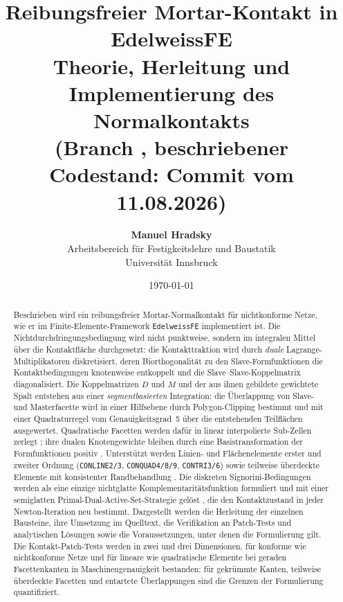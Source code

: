 \documentclass[a4paper,11pt]{article}
\title{\textbf{Reibungsfreier Mortar-Kontakt in EdelweissFE}\\
\large Theorie, Herleitung und Implementierung des Normalkontakts\\
\normalsize (Branch \code{0\_mortarcontact}, beschriebener Codestand: Commit \code{e2b57ac} vom 11.08.2026)}
\author{\textbf{Manuel Hradsky}\\
\small Arbeitsbereich f\"ur Festigkeitslehre und Baustatik\\
\small Universit\"at Innsbruck}
\date{\today}
\def\bm#1{#1}%
\newcommand{\code}[1]{\texttt{\small #1}}
\begin{document}
\maketitle

\begin{abstract}
Beschrieben wird ein reibungsfreier Mortar-Normalkontakt für nichtkonforme Netze, wie er im
Finite-Elemente-Framework \code{EdelweissFE} implementiert ist. Die Nichtdurchdringungsbedingung
wird nicht punktweise, sondern im integralen Mittel über die Kontaktfläche durchgesetzt: die
Kontakttraktion wird durch \emph{duale} Lagrange-Multiplikatoren \citep{wohlmuth2000} diskretisiert,
deren Biorthogonalität zu den Slave-Formfunktionen die Kontaktbedingungen knotenweise entkoppelt und
die Slave--Slave-Koppelmatrix diagonalisiert. Die Koppelmatrizen $\bm D$ und $\bm M$ und der aus
ihnen gebildete gewichtete Spalt entstehen aus einer \emph{segmentbasierten} Integration: die
Überlappung von Slave- und Masterfacette wird in einer Hilfsebene durch Polygon-Clipping
\citep{sutherland1974} bestimmt und mit einer Quadraturregel vom Genauigkeitsgrad~5
\citep{dunavant1985} über die entstehenden Teilflächen ausgewertet. Quadratische Facetten werden
dafür in linear interpolierte Sub-Zellen zerlegt \citep{puso2008}; ihre dualen Knotengewichte
bleiben durch eine Basistransformation der Formfunktionen positiv \citep{popp2012}. Unterstützt
werden Linien- und Flächenelemente erster und zweiter Ordnung (\code{CONLINE2/3},
\code{CONQUAD4/8/9}, \code{CONTRI3/6}) sowie teilweise überdeckte Elemente mit konsistenter
Randbehandlung \citep{cichosz}. Die diskreten Signorini-Bedingungen werden als eine einzige
nichtglatte Komplementaritätsfunktion \citep[Gl.~(55)]{gitterle} formuliert und mit einer
semiglatten Primal-Dual-Active-Set-Strategie gelöst \citep{hueber2005}, die den Kontaktzustand in
jeder Newton-Iteration neu bestimmt. Dargestellt werden die Herleitung der einzelnen Bausteine, ihre
Umsetzung im Quelltext, die Verifikation an Patch-Tests und analytischen Lösungen sowie die
Voraussetzungen, unter denen die Formulierung gilt. Die Kontakt-Patch-Tests werden in zwei und drei
Dimensionen, für konforme wie nichtkonforme Netze und für lineare wie quadratische Elemente bei
geraden Facettenkanten in Maschinengenauigkeit bestanden; für gekrümmte Kanten, teilweise
überdeckte Facetten und entartete Überlappungen sind die Grenzen der Formulierung quantifiziert.
\end{abstract}

\clearpage
\tableofcontents
\clearpage
\listoffigures
\clearpage
\end{document}
